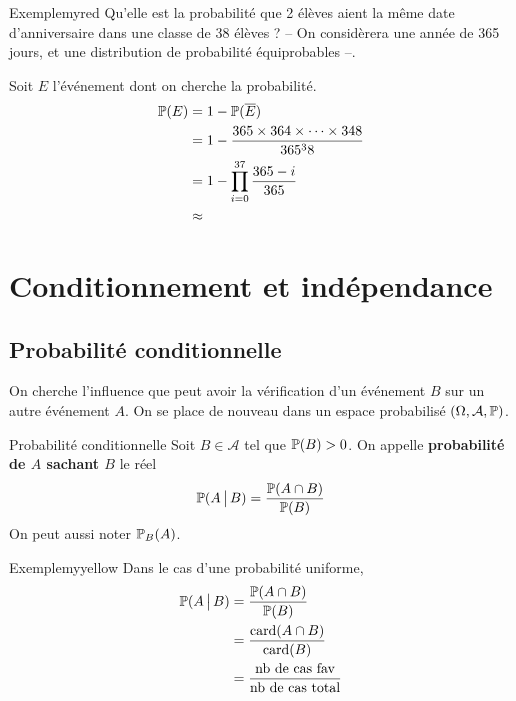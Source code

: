     \begin{omed}{Exemple}{myred}
        Qu’elle est la probabilité que 2 élèves aient la même date d’anniversaire dans une classe de 38 élèves ? -- On considèrera une année de 365 jours, et une distribution de probabilité équiprobables --.

        Soit $E$ l’événement dont on cherche la probabilité. 
        \begin{align*}
            \P(E) &= 1 - \P(\ovl{E}) \\
            &= 1 - \frac{365 \times 364 \times \cdots \times 348}{365^38} \\
            &= 1 - \prod_{i=0}^{37} \frac{365 - i}{365} \\
            &\approx 
        \end{align*}
    \end{omed}

\section{Conditionnement et indépendance}

    \subsection{Probabilité conditionnelle}

    On cherche l’influence que peut avoir la vérification d’un événement $B$ sur un autre événement $A$. On se place de nouveau dans un espace probabilisé $(\Omega, \mathcal{A}, \P)$.

    \begin{defi}{Probabilité conditionnelle}{}
        Soit $B \in \mathcal{A}$ tel que $\P(B) > 0$. On appelle \textbf{probabilité de $A$ sachant $B$} le réel 
        \[ \P(A \vbar B) = \frac{\P(A \cap B)}{\P(B)} \]   
        On peut aussi noter $\P_B(A)$. 
    \end{defi}

    \begin{omed}{Exemple}{myyellow}
        Dans le cas d’une probabilité uniforme, 
        \begin{align*}
            \P(A \vbar B) 
            &= \frac{\P(A \cap B)}{\P(B)} \\
            &= \frac{\card(A \cap B)}{\card(B)} \\
            &= \frac{\text{nb de cas fav}}{\text{nb de cas total}}
        \end{align*}
    \end{omed}

